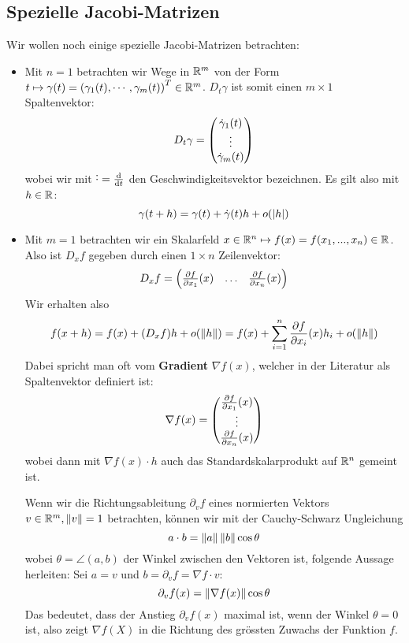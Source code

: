 \subsection{Spezielle Jacobi-Matrizen}
Wir wollen noch einige spezielle Jacobi-Matrizen betrachten:
\begin{itemize}
    \item Mit $n=1$ betrachten wir Wege in $\mathbb{R}^m$ von der Form $t\mapsto \gamma(t) = \left(\gamma_1(t), \cdots, \gamma_m(t)\right)^T \in \mathbb{R}^m$. $D_t\gamma$ ist somit einen $m \times 1$ Spaltenvektor:
    $$D_t\gamma = \begin{pmatrix}
    \Dot{\gamma}_1(t)\\ \vdots \\ \Dot{\gamma}_m(t)
    \end{pmatrix}$$
    wobei wir mit $\Dot{\cdot} = \diff{}{t}$ den Geschwindigkeitsvektor bezeichnen. Es gilt also mit $h \in \mathbb{R}$:
    $$\gamma(t+h) = \gamma(t) + \Dot{\gamma}(t)h + o(\left|h\right|)$$
    \item Mit $m = 1$ betrachten wir ein Skalarfeld $x\in \mathbb{R}^n \mapsto f(x) = f(x_1,...,x_n) \in \mathbb{R}$. Also ist $D_xf$ gegeben durch einen $1\times n$ Zeilenvektor:
    $$D_xf = \mat{ \diffp{f}{x_1}(x) & \hdots & \diffp{f}{x_n}(x)  }$$
    Wir erhalten also
    $$f(x+h) = f(x) + (D_xf)h + o(\norm{h}) = f(x) + \sum_{i=1}^n \diffp{f}{x_i}(x)h_i + o(\norm{h})$$
    Dabei spricht man oft vom \textbf{Gradient} $\nabla f(x)$, welcher in der Literatur als Spaltenvektor definiert ist:
    $$\nabla f(x) = \mat{ \diffp{f}{x_1}(x) \\ \vdots \\ \diffp{f}{x_n}(x)  }$$
    wobei dann mit $\nabla f(x) \cdot h$ auch das Standardskalarprodukt auf $\mathbb{R}^n$ gemeint ist.
    
    Wenn wir die Richtungsableitung $\partial_vf$ eines normierten Vektors $v \in \mathbb{R}^m, \left\|v\right\| = 1$ betrachten, können wir mit der Cauchy-Schwarz Ungleichung
    $$a\cdot b = \left\|a\right\|\left\|b\right\| \cos \theta$$
    wobei $\theta = \angle(a,b)$ der Winkel zwischen den Vektoren ist, folgende Aussage herleiten: Sei $a = v$ und $b = \partial_vf = \nabla f\cdot v$:
    $$\partial_vf(x) = \left\|\nabla f(x)\right\| \cos \theta$$
    Das bedeutet, dass der Anstieg $\partial_v f(x)$ maximal ist, wenn der Winkel $\theta = 0$ ist, also zeigt $\nabla f(X)$ in die Richtung des grössten Zuwachs der Funktion $f$.
\end{itemize}


